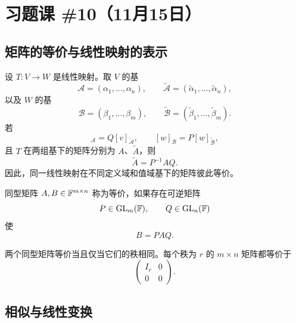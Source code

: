 \section{习题课 \#10（11月15日）}

\subsection{矩阵的等价与线性映射的表示}

设 $T:V\to W$ 是线性映射。取 $V$ 的基
\begin{equation}
 \mathcal A=(\alpha_1,\ldots,\alpha_n),
 \qquad
 \widetilde{\mathcal A}=(\widetilde\alpha_1,\ldots,\widetilde\alpha_n),
\end{equation}
以及 $W$ 的基
\begin{equation}
 \mathcal B=(\beta_1,\ldots,\beta_m),
 \qquad
 \widetilde{\mathcal B}=(\widetilde\beta_1,\ldots,\widetilde\beta_m).
\end{equation}
若
\begin{equation}
 [v]_{\mathcal A}=Q[v]_{\widetilde{\mathcal A}},
 \qquad
 [w]_{\mathcal B}=P[w]_{\widetilde{\mathcal B}},
\end{equation}
且 $T$ 在两组基下的矩阵分别为 $A$、$\widetilde A$，则
\begin{equation}
 \widetilde A=P^{-1}AQ.
\end{equation}
因此，同一线性映射在不同定义域和值域基下的矩阵彼此等价。

\begin{definition}
同型矩阵 $A,B\in\mathbb F^{m\times n}$ 称为等价，如果存在可逆矩阵
\begin{equation}
 P\in\operatorname{GL}_m(\mathbb F),
 \qquad Q\in\operatorname{GL}_n(\mathbb F)
\end{equation}
使
\begin{equation}
 B=PAQ.
\end{equation}
\end{definition}

\begin{theorem}
两个同型矩阵等价当且仅当它们的秩相同。每个秩为 $r$ 的 $m\times n$ 矩阵都等价于
\begin{equation}
 \begin{pmatrix}I_r&0\\0&0\end{pmatrix}.
\end{equation}
\end{theorem}

\subsection{相似与线性变换}

